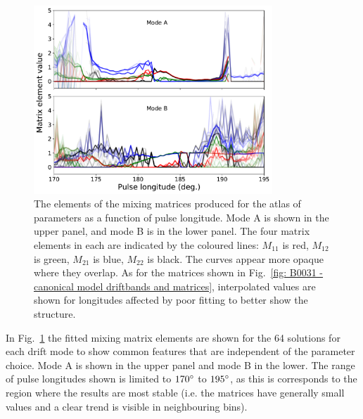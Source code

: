 \begin{figure}
    \begin{center}
        \includegraphics[width=0.8\textwidth]{Figures/B0031/atlas/atlas_matrices}
        \caption[The mixing matrices for the atlas of parameters]{The elements of the mixing matrices produced for the atlas of parameters as a function of pulse longitude. Mode A is shown in the upper panel, and mode B is in the lower panel. The four matrix elements in each are indicated by the coloured lines: $M_{11}$ is red, $M_{12}$ is green, $M_{21}$ is blue, $M_{22}$ is black. The curves appear more opaque where they overlap. As for the matrices shown in Fig.~\ref{fig: B0031 - canonical model driftbands and matrices}, interpolated values are shown for longitudes affected by poor fitting to better show the structure.}
        \label{fig: B0031 - atlas matrices}      
    \end{center}
\end{figure}

In Fig.~\ref{fig: B0031 - atlas matrices} the fitted mixing matrix elements are shown for the 64 solutions for each drift mode to show common features that are independent of the parameter choice. Mode A is shown in the upper panel and mode B in the lower. The range of pulse longitudes shown is limited to $170^\circ$ to $195^\circ$, as this is corresponds to the region where the results are most stable (i.e. the matrices have generally small values and a clear trend is visible in neighbouring bins).

